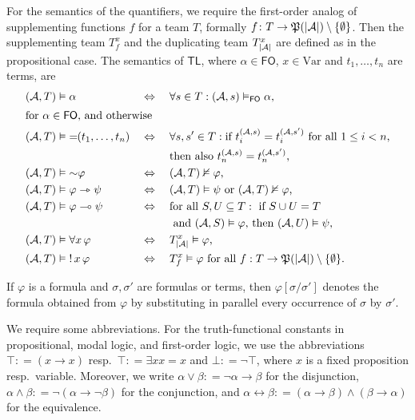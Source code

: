 \documentclass[a4paper,english,fleqn,11pt,final]{scrartcl}
\newcommand{\size}[1]{{\protect\ensuremath{\vert\nobreak#1\nobreak\vert}}}
\newcommand{\pow}[1]{{\protect\ensuremath{\mathord{\mathfrak{P}(\nobreak#1\nobreak)}}}}
\newcommand{\negg}{{\sim}}
\newcommand{\dep}[1]{{=\!\!(#1)}}
\newcommand{\logic}[1]{\ensuremath{\mathsf{#1}}\xspace}
\newcommand{\FO}{\logic{FO}}
\newcommand{\TL}{\logic{TL}}
\newcommand{\Var}{\mathrm{Var}}
\newcommand{\calA}{\protect\ensuremath{\mathcal{A}}}
\providecommand{\dfn}{\mathrel{\mathop:}=}
\newcommand{\imp}{\rightarrow}
\newcommand{\limp}{\multimap}
\newcommand{\timp}{\rightarrowtriangle}
\newcommand{\equ}{\leftrightarrow}
\DeclareMathOperator{\shriek}{!}
\theoremstyle{plain}
\theoremstyle{definition}
\begin{document}
For the semantics of the quantifiers, we require the first-order analog of supplementing functions $f$ for a team $T$, formally $f \colon T \to \pow{\size{\cal{A}}}\setminus \{\emptyset\}$.
Then the supplementing team $T^x_f$ and the duplicating team $T^x_{\size{\calA}}$ are defined as in the propositional case.
The semantics of $\TL$, where $\alpha \in \FO$, $x \in \Var$ and $t_1,\ldots,t_n$ are terms, are
\begin{alignat*}{3}
    &(\calA,T) \vDash \alpha&& \Leftrightarrow \; &&\forall s \in T : (\calA,s) \vDash_{\FO} \alpha\text{,}\\
    \intertext{for $\alpha \in \FO$, and otherwise}
    &(\calA,T) \vDash \dep{t_1,\ldots,t_n} && \Leftrightarrow \; &&\forall s,s' \in T : \text{if }t_i^{(\calA,s)} = t_i^{(\calA,s')}\text{ for all }1 \leq i < n\text{,}\\
    & && &&\text{then also }t_n^{(\calA,s)} = t_n^{(\calA,s')}\text{,}\\
    &(\calA,T) \vDash \negg\varphi&&\Leftrightarrow&& (\calA,T) \nvDash \varphi\text{,}\\
    &(\calA,T) \vDash \varphi \timp \psi&&\Leftrightarrow&& (\calA,T) \vDash \psi \text{ or }(\calA,T)\nvDash \varphi\text{,}\\
    &(\calA,T) \vDash \varphi \limp \psi\;&&\Leftrightarrow&& \text{for all } S, U \subseteq T : \text{ if }S \cup U = T \\
    & && && \text{ and }(\calA,S) \vDash \varphi\text{, then }(\calA,U) \vDash \psi\text{,}\\
    &(\calA,T) \vDash \forall x \,\varphi &&\Leftrightarrow &&T^x_{\size{\calA}} \vDash \varphi \text{,}\\
    &(\calA,T) \vDash \shriek x \, \varphi &&\Leftrightarrow&& T^x_{f} \vDash \varphi \text{ for all  }f : T \to \pow{\size{\calA}} \setminus \{\emptyset\} \text{.}
\end{alignat*}

\smallskip

If $\varphi$ is a formula and $\sigma,\sigma'$ are formulas or terms, then $\varphi[\sigma/\sigma']$ denotes the formula obtained from $\varphi$ by substituting in parallel every occurrence of $\sigma$ by $\sigma'$.


\medskip

We require some abbreviations.
For the truth-functional constants in propositional, modal logic, and first-order logic, we use the abbreviations $\top \dfn (x \imp x)$ resp.\ $\top \dfn \exists x x = x$ and $\bot \dfn \neg \top$, where $x$ is a fixed proposition resp.\ variable.
Moreover, we write $\alpha \lor \beta \dfn \neg \alpha \imp \beta$ for the disjunction, $\alpha \land \beta \dfn \neg(\alpha \imp \neg \beta)$ for the conjunction, and $\alpha \equ \beta \dfn (\alpha \imp \beta) \land (\beta \imp \alpha)$ for the equivalence.
\end{document}
